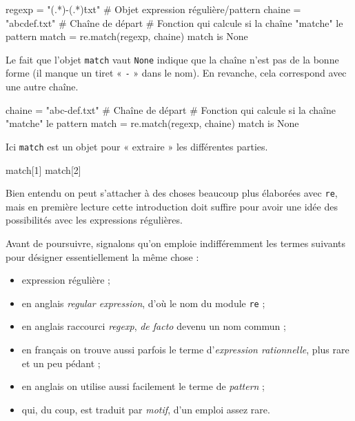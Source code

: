 \begin{idleconsole}
	\begin{pyconsole}
		regexp = "(.*)-(.*)\.txt" # Objet expression régulière/pattern
		chaine = "abcdef.txt" # Chaîne de départ
		# Fonction qui calcule si la chaîne "matche" le pattern
		match = re.match(regexp, chaine)
		match is None
	\end{pyconsole}
\end{idleconsole}

Le fait que l'objet \texttt{match} vaut \texttt{None} indique que la chaîne n'est pas de la bonne forme (il manque un tiret « \texttt{-} » dans le nom). En revanche, cela correspond avec une autre chaîne.

\begin{idleconsole}
	\begin{pyconsole}
		chaine = "abc-def.txt" # Chaîne de départ
		# Fonction qui calcule si la chaîne "matche" le pattern
		match = re.match(regexp, chaine)
		match is None
	\end{pyconsole}
\end{idleconsole}

Ici \texttt{match} est un objet pour « extraire » les différentes parties.

\begin{idleconsole}
	\begin{pyconsole}
		match[1]
		match[2]
	\end{pyconsole}
\end{idleconsole}

Bien entendu on peut s'attacher à des choses beaucoup plus élaborées avec \texttt{re}, mais en première lecture cette introduction doit suffire pour avoir une idée des possibilités avec les expressions régulières.

Avant de poursuivre, signalons qu'on emploie indifféremment les termes suivants pour désigner essentiellement la même chose :
\begin{itemize}
\item expression régulière ;
\item en anglais \textit{regular expression}, d'où le nom du module \texttt{re} ;
\item en anglais raccourci \textit{regexp}, \textit{de facto} devenu un nom commun ;
\item en français on trouve aussi parfois le terme d'\emph{expression rationnelle}, plus rare et un peu pédant ;
\item en anglais on utilise aussi facilement le terme de \textit{pattern} ;
\item qui, du coup, est traduit par \emph{motif}, d'un emploi assez rare.
\end{itemize}

